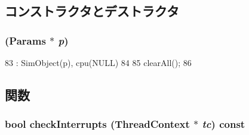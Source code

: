 \subsection{コンストラクタとデストラクタ}
\hypertarget{classArmISA_1_1Interrupts_a3d148759405b99148e0c34750966edb1}{
\subsubsection[{Interrupts}]{ ({\bf Params} $\ast$ {\em p})}}
\label{classArmISA_1_1Interrupts_a3d148759405b99148e0c34750966edb1}



\begin{DoxyCode}
83                            : SimObject(p), cpu(NULL)
84     {
85         clearAll();
86     }
\end{DoxyCode}


\subsection{関数}
\hypertarget{classArmISA_1_1Interrupts_af3c66fb49fec598cf78aaec29d764952}{
\subsubsection[{checkInterrupts}]{\setlength{\rightskip}{0pt plus 5cm}bool checkInterrupts ({\bf ThreadContext} $\ast$ {\em tc}) const}}
\label{classArmISA_1_1Interrupts_af3c66fb49fec598cf78aaec29d764952}



